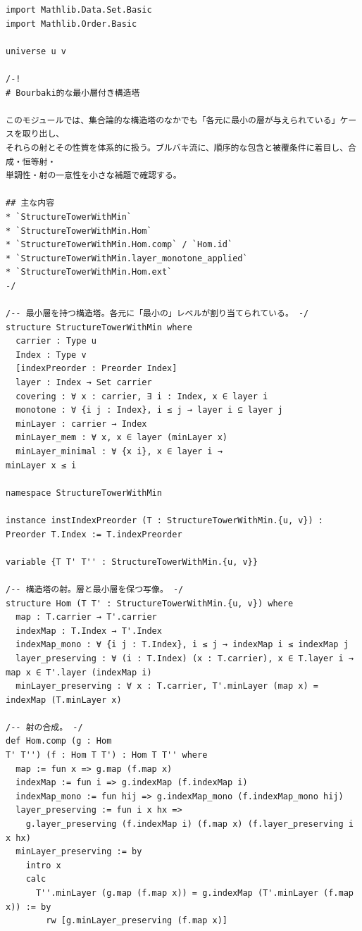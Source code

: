 \documentclass[11pt]{ltjsarticle}
\theoremstyle{definition}
\theoremstyle{plain}
\theoremstyle{remark}
\begin{document}
\begin{lstlisting}[caption={P2.lean}, label={lst:p2}]
import Mathlib.Data.Set.Basic
import Mathlib.Order.Basic

universe u v

/-!
# Bourbaki的な最小層付き構造塔

このモジュールでは、集合論的な構造塔のなかでも「各元に最小の層が与えられている」ケースを取り出し、
それらの射とその性質を体系的に扱う。ブルバキ流に、順序的な包含と被覆条件に着目し、合成・恒等射・
単調性・射の一意性を小さな補題で確認する。

## 主な内容
* `StructureTowerWithMin`
* `StructureTowerWithMin.Hom`
* `StructureTowerWithMin.Hom.comp` / `Hom.id`
* `StructureTowerWithMin.layer_monotone_applied`
* `StructureTowerWithMin.Hom.ext`
-/

/-- 最小層を持つ構造塔。各元に「最小の」レベルが割り当てられている。 -/
structure StructureTowerWithMin where
  carrier : Type u
  Index : Type v
  [indexPreorder : Preorder Index]
  layer : Index → Set carrier
  covering : ∀ x : carrier, ∃ i : Index, x ∈ layer i
  monotone : ∀ {i j : Index}, i ≤ j → layer i ⊆ layer j
  minLayer : carrier → Index
  minLayer_mem : ∀ x, x ∈ layer (minLayer x)
  minLayer_minimal : ∀ {x i}, x ∈ layer i → 
minLayer x ≤ i

namespace StructureTowerWithMin

instance instIndexPreorder (T : StructureTowerWithMin.{u, v}) : Preorder T.Index := T.indexPreorder

variable {T T' T'' : StructureTowerWithMin.{u, v}}

/-- 構造塔の射。層と最小層を保つ写像。 -/
structure Hom (T T' : StructureTowerWithMin.{u, v}) where
  map : T.carrier → T'.carrier
  indexMap : T.Index → T'.Index
  indexMap_mono : ∀ {i j : T.Index}, i ≤ j → indexMap i ≤ indexMap j
  layer_preserving : ∀ (i : T.Index) (x : T.carrier), x ∈ T.layer i → map x ∈ T'.layer (indexMap i)
  minLayer_preserving : ∀ x : T.carrier, T'.minLayer (map x) = indexMap (T.minLayer x)

/-- 射の合成。 -/
def Hom.comp (g : Hom 
T' T'') (f : Hom T T') : Hom T T'' where
  map := fun x => g.map (f.map x)
  indexMap := fun i => g.indexMap (f.indexMap i)
  indexMap_mono := fun hij => g.indexMap_mono (f.indexMap_mono hij)
  layer_preserving := fun i x hx =>
    g.layer_preserving (f.indexMap i) (f.map x) (f.layer_preserving i x hx)
  minLayer_preserving := by
    intro x
    calc
      T''.minLayer (g.map (f.map x)) = g.indexMap (T'.minLayer (f.map x)) := by
        rw [g.minLayer_preserving (f.map x)]
  

\end{lstlisting}
\end{document}
